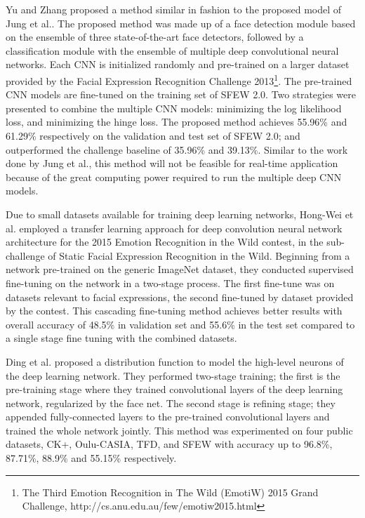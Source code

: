 \documentclass[master]{thesis-uestc}
\begin{document}
Yu and Zhang\cite{Yu:2015:IBS:2818346.2830595} proposed a method similar in fashion to the proposed model of Jung et al.\cite{7410698}. The proposed method was made up of a face detection module based on the ensemble of three state-of-the-art face detectors, followed by a classification module with the ensemble of multiple deep convolutional neural networks. Each CNN is initialized randomly and pre-trained on a larger dataset provided by the Facial Expression Recognition Challenge 2013\footnote{The Third Emotion Recognition in The Wild (EmotiW) 2015 Grand Challenge, http://cs.anu.edu.au/few/emotiw2015.html}. The pre-trained CNN models are fine-tuned on the training set of SFEW 2.0\cite{dhall2012collecting}. Two strategies were presented to combine the multiple CNN models: minimizing the log likelihood loss, and minimizing the hinge loss. The proposed method achieves 55.96\% and 61.29\% respectively on the validation and test set of SFEW 2.0; and outperformed the challenge baseline of 35.96\% and 39.13\%. Similar to the work done by Jung et al.\cite{7410698}, this method will not be feasible for real-time application because of the great computing power required to run the multiple deep CNN models.

Due to small datasets available for training deep learning networks, Hong-Wei et al.\cite{Ng:2015:DLE:2818346.2830593} employed a transfer learning approach for deep convolution neural network architecture for the 2015 Emotion Recognition in the Wild contest, in the sub-challenge of Static Facial Expression Recognition in the Wild. Beginning from a network pre-trained on the generic ImageNet dataset, they conducted supervised fine-tuning on the network in a two-stage process. The first fine-tune was on datasets relevant to facial expressions, the second fine-tuned by dataset provided by the contest. This cascading fine-tuning method achieves better results with overall accuracy of 48.5\% in validation set and 55.6\% in the test set compared to a single stage fine tuning with the combined datasets.

Ding et al.\cite{7961731} proposed a distribution function to model the high-level neurons of the deep learning network. They performed two-stage training; the first is the pre-training stage where they trained convolutional layers of the deep learning network, regularized by the face net. The second stage is refining stage; they appended fully-connected layers to the pre-trained convolutional layers and trained the whole network jointly. This method was experimented on four public datasets, CK+, Oulu-CASIA, TFD, and SFEW\cite{6130508} with accuracy up to 96.8\%, 87.71\%, 88.9\% and 55.15\% respectively.
\end{document}
